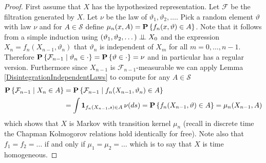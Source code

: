 \begin{proof}
First assume that $X$ has the hypothesized representation.  Let
$\mathcal{F}$ be the filtration generated by $X$.  Let $\nu$ be the
law of $\vartheta_1, \vartheta_2, \dotsc$.  Pick a
random element $\vartheta$ with law $\nu$ and for $A \in
\mathcal{S}$ define $\mu_n(x, A) = \probability{f_n(x, \vartheta) \in
  A}$.  Note that it follows from a simple induction using
$(\vartheta_1, \vartheta_2, \dotsc) \Independent X_0$ and the
expression $X_n = f_n(X_{n-1}, \vartheta_n)$ that $\vartheta_n$ is
independent of $X_m$ for all $m = 0, \dotsc, n-1$.  Therefore $\cprobability{\vartheta_n \in \cdot}
{\mathcal{F}_{n-1}} = \probability{\vartheta \in \cdot} = \nu$ and in particular has a regular
version. Furthermore since $X_{n-1}$ is $\mathcal{F}_{n-1}$-measurable
we can apply Lemma \ref{DisintegrationIndependentLaws} to compute for any $A \in \mathcal{S}$
\begin{align*}
\cprobability{X_n \in A}{\mathcal{F}_{n-1}} &=
\cprobability{f_n(X_{n-1}, \vartheta_n) \in A}{\mathcal{F}_{n-1}} \\
&=\int \characteristic{f_n (X_{n-1}, s)\in A} \, \nu(ds) =
\probability{f_n (X_{n-1}, \vartheta)\in A} = \mu_n(X_{n-1}, A)
\end{align*}
which shows that $X$ is Markov with transition kernel $\mu_n$ (recall
in discrete time the Chapman Kolmogorov relations hold identically for
free).  Note also that $f_1 = f_2 = \dotsc$ if and only if $\mu_1 =
\mu_2 = \dotsc$ which is to say that $X$ is time homogeneous.


\end{proof}
